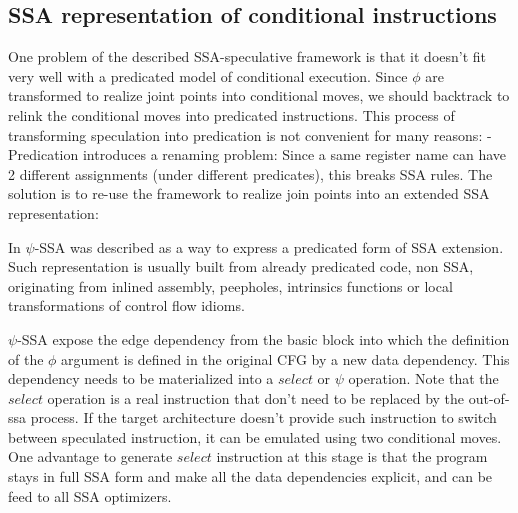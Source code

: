 \subsection{SSA representation of conditional instructions}

One problem of the described SSA-speculative framework is that it doesn't fit very well with a predicated model of conditional execution. Since $\phi$ are transformed to realize joint points into conditional moves, we should backtrack to relink the conditional moves into predicated instructions. This process of transforming speculation into predication is not convenient for many reasons:
- Predication introduces a renaming problem: Since a same register name can have 2 different assignments (under different predicates), this breaks SSA rules. The solution is to re-use the framework to realize join points into an extended SSA representation:

In \cite{Stoutchinin:2001:ESS:563998.564022} $\psi$-SSA was described as a way to express a predicated form of SSA extension. Such representation is usually built from already predicated code, non SSA, originating from inlined assembly, peepholes, intrinsics functions or local transformations of control flow idioms. 

$\psi$-SSA expose the edge dependency from the basic block into which the definition of the $\phi$ argument is defined in the original CFG by a new data dependency. This dependency needs to be materialized into a $select$ or $\psi$ operation. Note that the $select$ operation is a real instruction that don't need to be replaced by the out-of-ssa process. If the target architecture doesn't provide such instruction to switch between speculated instruction, it can be emulated using two conditional moves. One advantage to generate $select$ instruction at this stage is that the program stays in full SSA form and make all the data dependencies explicit, and can be feed to all SSA optimizers. 

